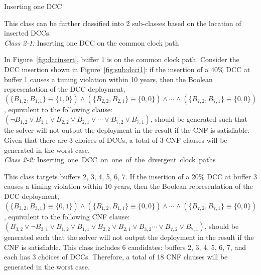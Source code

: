 \begin{class}
\label{class:c2}
Inserting one DCC

This class can be further classified into 2 sub-classes based on the location of inserted DCCs. \\
\textit{Class 2-1:} Inserting one DCC on the common clock path

In Figure~\ref{fig:dccinsert}, buffer 1 is on the common clock path. Consider the DCC insertion shown in Figure~\ref{fig:sub:dcci1}: if the insertion of a 40\% DCC at buffer 1 causes a timing violation within 10 years, then the Boolean representation of the DCC deployment, {\fontsize{8}{8.4}$\left(\{B_{1,2}, B_{1,1}\} \equiv \{1, 0\} \right) \land \left( \{B_{2,2}, B_{2,1}\} \equiv \{0, 0\} \right) \land \dotsb \land \left( \{B_{7,2}, B_{7,1}\} \equiv \{0, 0\} \right)$}, equivalent to the following clause:  {\fontsize{8}{8.4}$\left(\neg B_{1,2} \lor B_{1,1} \lor B_{2,2} \lor B_{2,1} \lor \dotsb \lor B_{7,2} \lor B_{7,1} \right)$}, should be generated such that the solver will not output the deployment in the result if the CNF is satisfiable. Given that there are 3 choices of DCCs, a total of 3 CNF clauses will be generated in the worst case. \\
\textit{Class 2-2:} \mbox{\fontsize{9}{10.8}\selectfont Inserting one DCC on one of the divergent clock paths}

This class targets buffers 2, 3, 4, 5, 6, 7. If the insertion of a 20\% DCC at buffer 3 causes a timing violation within 10 years, then the Boolean representation of the DCC deployment,  {\fontsize{8}{8.4}$\left(\{B_{3,2}, B_{3,1}\} \equiv \{0, 1\} \right) \land \left( \{B_{1,2}, B_{1,1}\} \equiv \{0, 0\} \right) \land \dotsb \land \left( \{B_{7,2}, B_{7,1}\} \equiv \{0, 0\} \right)$}, equivalent to the following CNF clause:  {\fontsize{8}{8.4}$\left(B_{3,2} \lor \neg B_{3,1} \lor B_{1,2} \lor B_{1,1} \lor B_{2,2} \lor B_{2,1} \lor B_{3,2} \dotsb \lor B_{7,2} \lor B_{7,1} \right)$}, should be generated such that the solver will not output the deployment in the result if the CNF is satisfiable. This class includes 6 candidates: buffers 2, 3, 4, 5, 6, 7, and each has 3 choices of DCCs. Therefore, a total of 18 CNF clauses will be generated in the worst case.
\end{class}

